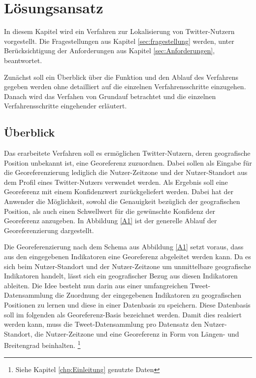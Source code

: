 \chapter{Lösungsansatz} \label{chp:Loesungsansatz}
In diesem Kapitel wird ein Verfahren zur Lokalisierung von Twitter-Nutzern vorgestellt.
Die Fragestellungen aus Kapitel \ref{sec:fragestellung} werden, unter Berücksichtigung der Anforderungen aus Kapitel \ref{sec:Anforderungen}, beantwortet.  

Zunächst soll ein Überblick über die Funktion und den Ablauf des Verfahrens gegeben werden ohne detailliert auf die einzelnen Verfahrensschritte einzugehen.
Danach wird das Verfahen von Grundauf betrachtet und die einzelnen Verfahrensschritte eingehender erläutert. 

	\section{Überblick} \label{sec:ueberblick} 

	Das erarbeitete Verfahren soll es ermöglichen Twitter-Nutzern, deren geografische Position unbekannt ist, eine Georeferenz zuzuordnen.
	Dabei sollen als Eingabe für die Georeferenzierung lediglich die Nutzer-Zeitzone und der Nutzer-Standort aus dem Profil eines Twitter-Nutzers verwendet werden.
	Als Ergebnis soll eine Georeferenz mit einem Konfidenzwert zurückgeliefert werden. 
	Dabei hat der Anwender die Möglichkeit, sowohl die Genauigkeit bezüglich der geografischen Position, als auch einen Schwellwert für die gewünschte Konfidenz der Georeferenz anzugeben.
	In Abbildung \ref{A1} ist der generelle Ablauf der Georeferenzierung dargestellt. 
	\label{A1} 

	Die Georeferenzierung nach dem Schema aus Abbildung \ref{A1} setzt voraus, dass aus den eingegebenen Indikatoren eine Georeferenz abgeleitet werden kann.
	Da es sich beim Nutzer-Standort und der Nutzer-Zeitzone um unmittelbare geografische Indikatoren handelt, lässt sich ein geografischer Bezug aus diesen Indikatoren ableiten.      
	Die Idee besteht nun darin aus einer umfangreichen Tweet-Datensammlung die Zuordnung der eingegebenen Indikatoren zu geografischen Positionen zu lernen und diese in einer Datenbasis zu speichern.
	Diese Datenbasis soll im folgenden als Georeferenz-Basis bezeichnet werden.
	Damit dies realsiert werden kann, muss die Tweet-Datensammlung pro Datensatz den Nutzer-Standort, die Nutzer-Zeitzone und eine Georeferenz in Form von Längen- und Breitengrad beinhalten.  \footnote{Siehe Kapitel \ref{chp:Einleitung} genutzte Daten}
	
